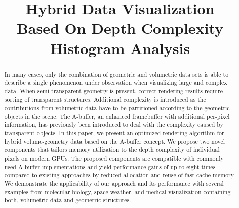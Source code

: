 \documentclass{egpubl}
\title[Hybrid Data Visualization]%
      {Hybrid Data Visualization\\ Based On Depth Complexity Histogram Analysis}
\author[]
        {}
\newcommand{\ab}{\mbox{A-buffer}}
\newlength{\imgWidth}
\newif\ifSplitBoxFramed
\newcommand{\splitImage}[2]{%
  \begin{tikzpicture}[x=\imgWidth,y=-\imgWidth] %
    \clip (0,0) rectangle (1,1);
    \begin{scope}[]
      \clip (0,0) -- (\topLineRatio,0) -- (\bottomLineRatio,1) -- (0,1);
      \draw(0,0) node[anchor=north west,inner sep=0pt]{%
        \texttt{[image: \#1]}};
    \end{scope}
    \begin{scope}[]
      \clip  (\topLineRatio,0) -- (\bottomLineRatio,1) -- (1,1) -- (1,0);
      \draw(0,0) node[anchor=north west,inner sep=0pt]{%
        \texttt{[image: \#2]}};
    \end{scope}
    \draw[black,very thick] (\topLineRatio,0) -- (\bottomLineRatio,1) ;
    \ifSplitBoxFramed%
      \draw[line width=1pt] (0,0) rectangle (1,1);
    \fi
  \end{tikzpicture}
}
\newcommand{\goldenRatioLong}{0.618}
\newcommand{\goldenRatioShort}{0.382}
\newcommand{\setSplitLineRatios}[2]{%
  \def\topLineRatio{#1}
  \def\bottomLineRatio{#2}
}
\begin{document}
\setSplitLineRatios{\goldenRatioLong}{\goldenRatioShort}


\maketitle

\begin{abstract}
%
In many cases, only the combination of geometric and volumetric data sets is able to describe a single phenomenon under observation when visualizing large and complex data.
When semi-transparent geometry is present, correct rendering results require sorting of transparent structures. 
Additional complexity is introduced as the contributions from volumetric data have to be partitioned according to the geometric objects in the scene.
The \ab{}, an enhanced framebuffer with additional per-pixel information, has previously been introduced to deal with the complexity caused by transparent objects. 
In this paper, we present an optimized rendering algorithm for hybrid volume-geometry data based on the \ab{} concept. 
We propose two novel components that tailors memory utilization to the depth complexity of individual pixels on modern GPUs. 
The proposed components are compatible with commonly used \ab{} implementations and yield performance gains of up to eight times compared to existing approaches by reduced allocation and reuse of fast cache memory. 
%
We demonstrate the applicability of our approach and its performance with several examples from molecular biology, space weather, and medical visualization containing both, volumetric data and geometric structures.

\begin{classification} %
\end{classification}

\end{abstract}
\end{document}
